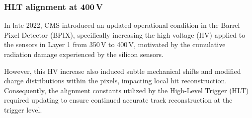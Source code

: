 





\subsubsection{HLT alignment at 400\,V}



In late 2022, CMS introduced an updated operational condition in the Barrel Pixel Detector (BPIX), specifically increasing the high voltage (HV) applied to the sensors in Layer 1 from 350\,V to 400\,V, motivated by the cumulative radiation damage experienced by the silicon sensors. 

However, this HV increase also induced subtle mechanical shifts and modified charge distributions within the pixels, impacting local hit reconstruction. Consequently, the alignment constants utilized by the High-Level Trigger (HLT) required updating to ensure continued accurate track reconstruction at the trigger level. 


